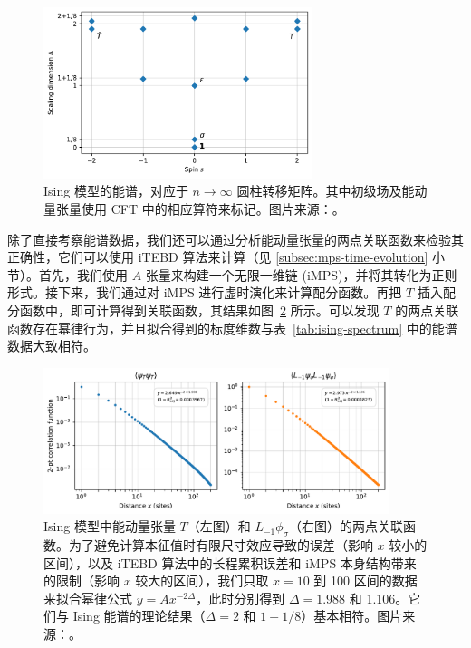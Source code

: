 \begin{figure}[ht]
  \centering
  \includegraphics[width=0.7\textwidth]{images/fibonacci/ising-spectrum.pdf}
  \caption[Ising 模型的能谱]{Ising 模型的能谱，对应于 $n\to\infty$ 圆柱转移矩阵。其中初级场及能动量张量使用 CFT 中的相应算符来标记。图片来源：\parencite{zeng2023virasoro}。}
  \label{fig:ising-spectrum}
\end{figure}

除了直接考察能谱数据，我们还可以通过分析能动量张量的两点关联函数来检验其正确性，它们可以使用 iTEBD 算法来计算（见 \ref{subsec:mps-time-evolution} 小节）。首先，我们使用 $A$ 张量来构建一个无限一维链 (iMPS)，并将其转化为正则形式。接下来，我们通过对 iMPS 进行虚时演化来计算配分函数。再把 $T$ 插入配分函数中，即可计算得到关联函数，其结果如图~\ref{fig:ising-correlation-functions} 所示。可以发现 $T$ 的两点关联函数存在幂律行为，并且拟合得到的标度维数与表~\ref{tab:ising-spectrum} 中的能谱数据大致相符。

\begin{figure}[ht]
  \centering
  \includegraphics[width=0.9\textwidth]{images/fibonacci/ising-correlation-function.pdf}
  \caption[Ising 模型中的两点关联函数]{Ising 模型中能动量张量 $T$（左图）和 $L_{-1}\phi_\sigma$（右图）的两点关联函数。为了避免计算本征值时有限尺寸效应导致的误差（影响 $x$ 较小的区间），以及 iTEBD 算法中的长程累积误差和 iMPS 本身结构带来的限制（影响 $x$ 较大的区间），我们只取 $x=10$ 到 100 区间的数据来拟合幂律公式 $y=Ax^{-2\Delta}$，此时分别得到 $\Delta=1.988$ 和 1.106。它们与 Ising 能谱的理论结果（$\Delta=2$ 和 $1+1/8$）基本相符。图片来源：\parencite{zeng2023virasoro}。}
  \label{fig:ising-correlation-functions}
\end{figure}

